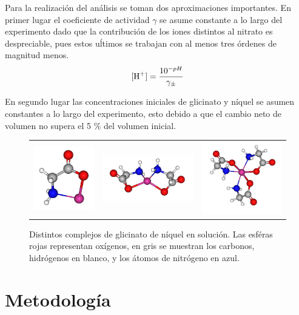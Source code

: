 \documentclass[fleqn,10pt]{SelfArx} %
\begin{document}
    Para la realizaci\'on del an\'alisis se toman dos aproximaciones importantes. En primer lugar el coeficiente de actividad $\gamma$ se asume constante a lo largo del experimento dado que la contribuci\'on de los iones distintos al nitrato es despreciable, pues estos u\'ltimos se trabajan con al menos tres \'ordenes de magnitud menos.
    \begin{equation}
	    \ce{[H+]} = \dfrac{10^{-pH}}{\gamma_\pm}
    \end{equation}
    
    En segundo lugar las concentraciones iniciales de glicinato y n\'iquel se asumen constantes a lo largo del experimento, esto debido a que el cambio neto de volumen no supera el 5 \% del volumen inicial.
    \begin{figure}[h]
    	\centering
    	\begin{tabular}{ccc}
    		\includegraphics[width=0.2\linewidth]{images/Single.png} & \includegraphics[width=0.4\linewidth]{images/Double.png} &
    		\includegraphics[width=0.3\linewidth]{images/Triple.png}
    	\end{tabular}
    	\caption{Distintos complejos de glicinato de n\'iquel en soluci\'on. Las esf\'eras rojas representan ox\'igenos, en gris se muestran los carbonos, hidr\'ogenos en blanco, y los \'atomos de nitr\'ogeno en azul.}
    	\label{fig:ligands}
    \end{figure}
	\section{Metodolog\'ia}
\end{document}
